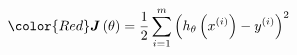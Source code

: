 \begin{equation}
{\color{Red}\boldsymbol{J}\left(\theta\right)=\frac{1}{2}\sum_{i=1}^m \left(h_\theta\left(x^{\left(i\right)}\right)-y^{\left(i\right)}\right)^2
}
\end{equation}

